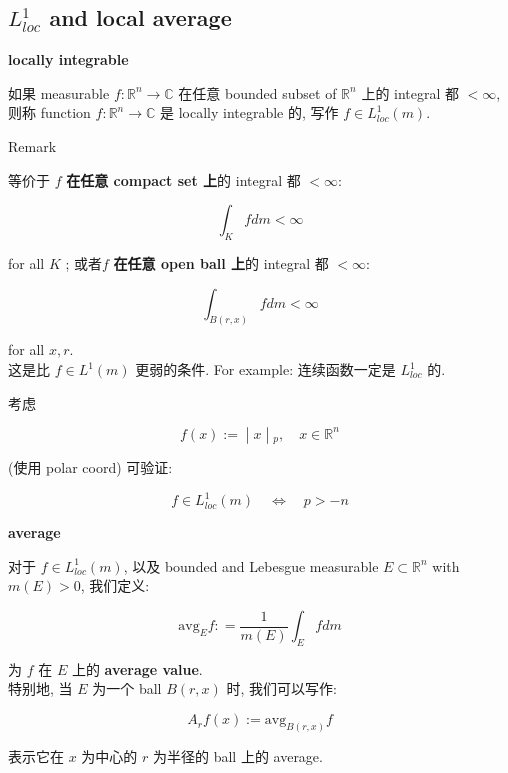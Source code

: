 \documentclass{qlnotes-export}
\begin{document}
\subsection{\texorpdfstring{\(L_{loc}^{1}\) and local average}{L\_\{loc\}\^{}\{1\} and local average}}\label{l_loc1-and-local-average}

\begin{definition}{\protect{}\label{kn-locally-integrable}{\textbf{locally
integrable}}}

如果 measurable \(f:{\mathbb{R}}^{n}\rightarrow{\mathbb{C}}\) 在任意 bounded subset of \({\mathbb{R}}^{n}\) 上的 integral 都 \(< \infty\), 则称 function \(f:{\mathbb{R}}^{n}\rightarrow{\mathbb{C}}\) 是 locally integrable 的, 写作 \(f \in L_{loc}^{1}(m)\).

\end{definition}

\begin{qlremark}{Remark}

等价于 \(f\) \textbf{在任意 compact set 上}的 integral 都 \(< \infty\):

\[\int_{K}f dm < \infty\]

for all \(K\) ; 或者\(f\) \textbf{在任意 open ball 上}的 integral 都 \(< \infty\):

\[\int_{B(r,x)}f dm < \infty\]

for all \(x,r\).\\
这是比 \(f \in L^{1}(m)\) 更弱的条件. For example: 连续函数一定是 \(L_{loc}^{1}\) 的.

\end{qlremark}

\begin{example}

考虑

\[\left. f(x) := \middle| x \middle| {}_{p},\quad x \in {\mathbb{R}}^{n} \right.\]

(使用 polar coord) 可验证:

\[f \in L_{loc}^{1}(m)\quad\Leftrightarrow\quad p > - n\]

\end{example}

\begin{definition}{\protect{}\label{kn-average}{\textbf{average}}}

对于 \(f \in L_{loc}^{1}(m)\), 以及 bounded and Lebesgue measurable \(E \subset {\mathbb{R}}^{n}\) with \(m(E) > 0\), 我们定义:

\[\text{avg}_{E}f: = \frac{1}{m(E)}\int_{E}f dm\]

为 \(f\) 在 \(E\) 上的 \textbf{average value}.\\
特别地, 当 \(E\) 为一个 ball \(B(r,x)\) 时, 我们可以写作:

\[A_{r}f(x) := \text{avg}_{B(r,x)}f\]

表示它在 \(x\) 为中心的 \(r\) 为半径的 ball 上的 average.

\end{definition}
\end{document}
